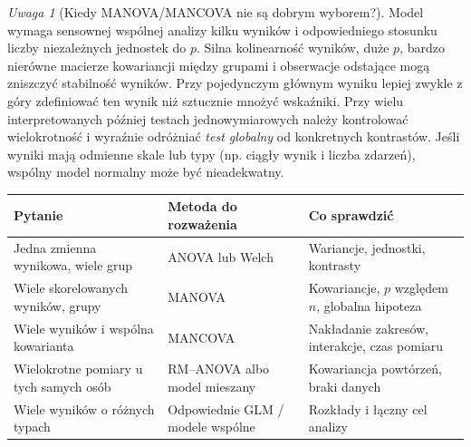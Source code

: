 \documentclass[11pt,a4paper,oneside]{report}
\numberwithin{equation}{chapter}
\theoremstyle{plain}
\theoremstyle{definition}
\theoremstyle{remark}
\newtheorem{uwaga}{Uwaga}[chapter]
\begin{document}
\begin{uwaga}[Kiedy MANOVA/MANCOVA nie są dobrym wyborem?]
Model wymaga sensownej wspólnej analizy kilku wyników i odpowiedniego stosunku liczby niezależnych jednostek do $p$. Silna kolinearność wyników, duże $p$, bardzo nierówne macierze kowariancji między grupami i obserwacje odstające mogą zniszczyć stabilność wyników. Przy pojedynczym głównym wyniku lepiej zwykle z góry zdefiniować ten wynik niż sztucznie mnożyć wskaźniki. Przy wielu interpretowanych później testach jednowymiarowych należy kontrolować wielokrotność i wyraźnie odróżniać \emph{test globalny} od konkretnych kontrastów. Jeśli wyniki mają odmienne skale lub typy (np. ciągły wynik i liczba zdarzeń), wspólny model normalny może być nieadekwatny.
\end{uwaga}

\begin{center}\small
\begin{tabular}{>{\raggedright\arraybackslash}p{}>{\raggedright\arraybackslash}p{}>{\raggedright\arraybackslash}p{}}
\toprule
\textbf{Pytanie} & \textbf{Metoda do rozważenia} & \textbf{Co sprawdzić}\\
\midrule
Jedna zmienna wynikowa, wiele grup & ANOVA lub Welch & Wariancje, jednostki, kontrasty\\
Wiele skorelowanych wyników, grupy & MANOVA & Kowariancje, $p$ względem $n$, globalna hipoteza\\
Wiele wyników i wspólna kowarianta & MANCOVA & Nakładanie zakresów, interakcje, czas pomiaru\\
Wielokrotne pomiary u tych samych osób & RM--ANOVA albo model mieszany & Kowariancja powtórzeń, braki danych\\
Wiele wyników o różnych typach & Odpowiednie GLM / modele wspólne & Rozkłady i łączny cel analizy\\
\bottomrule
\end{tabular}
\end{center}
\end{document}
